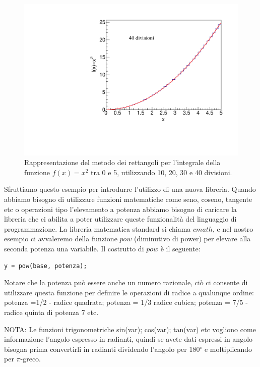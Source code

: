 \documentclass[11pt,fleqn]{book} %
\begin{document}
\begin{figure}[h]
\includegraphics[scale=0.3]{./Pictures/intpar40.pdf}
\caption{Rappresentazione del metodo dei rettangoli per l'integrale della funzione $f(x)=x^2$ tra 0 e 5, utilizzando 10, 20, 30 e 40 divisioni. \label{rettangoli}}
\end{figure}



Sfruttiamo questo esempio per introdurre l'utilizzo di una nuova libreria. Quando abbiamo bisogno di utilizzare funzioni matematiche come seno, coseno, tangente etc o operazioni tipo l'elevamento a potenza abbiamo bisogno di caricare la libreria che ci abilita a poter utilizzare queste funzionalità del linguaggio di programmazione. La libreria matematica standard si chiama $cmath$, e nel nostro esempio ci avvaleremo della funzione $pow$ (diminutivo di power) per elevare alla seconda potenza una variabile. Il costrutto di $pow$ è il seguente:
\begin{verbatim}
y = pow(base, potenza);
\end{verbatim}

Notare che la potenza può essere anche un numero razionale, ciò ci consente di utilizzare questa funzione per definire le operazioni di radice a qualunque ordine: potenza =1/2 - radice quadrata; potenza = 1/3 radice cubica; potenza = 7/5 - radice quinta di potenza 7 etc.

NOTA: Le funzioni trigonometriche sin(var); cos(var); tan(var) etc vogliono come informazione l'angolo espresso in radianti, quindi se avete dati espressi in angolo bisogna prima convertirli in radianti dividendo l'angolo per 180$^\circ$ e moltiplicando per $\pi$-greco. 
\end{document}
